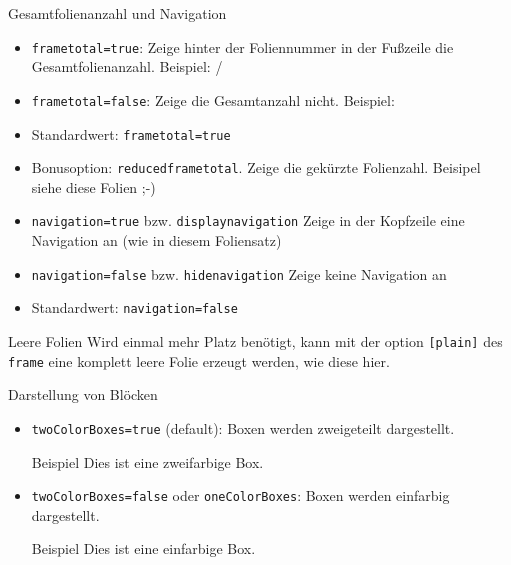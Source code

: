 \documentclass[german,10pt,xcolor=colortbl,compress
]{beamer}
\begin{document}
\begin{frame}{Gesamtfolienanzahl und Navigation}
	\begin{itemize}
		\item \lstinline|frametotal=true|: Zeige hinter der Foliennummer in der Fußzeile die Gesamtfolienanzahl. Beispiel: \insertframenumber{}/\inserttotalframenumber
		\item \lstinline|frametotal=false|: Zeige die Gesamtanzahl nicht. Beispiel: \insertframenumber{}
		\item Standardwert: \lstinline|frametotal=true|
		\item Bonusoption: \lstinline|reducedframetotal|. Zeige die gekürzte Folienzahl. Beisipel siehe diese Folien ;-)
	\end{itemize}
	\vspace{\baselineskip}
	\begin{itemize}
		\item \lstinline|navigation=true| bzw. \lstinline|displaynavigation| Zeige in der Kopfzeile eine Navigation an (wie in diesem Foliensatz)
		\item \lstinline|navigation=false| bzw. \lstinline|hidenavigation| Zeige keine Navigation an
		\item Standardwert: \lstinline|navigation=false|
	\end{itemize}
\end{frame}
\begin{frame}[plain]{Leere Folien}
	Wird einmal mehr Platz benötigt, kann mit der option \lstinline|[plain]| des \lstinline|frame| eine komplett leere Folie erzeugt werden, wie diese hier.
\end{frame}
\begin{frame}{Darstellung von Blöcken}
	\begin{itemize}
		\item \lstinline!twoColorBoxes=true! (default): Boxen werden zweigeteilt dargestellt.
		      \begin{block}{Beispiel}
			      Dies ist eine zweifarbige Box.
		      \end{block}
		\item \lstinline!twoColorBoxes=false! oder \lstinline!oneColorBoxes!: Boxen werden einfarbig dargestellt.
		      \begin{block}{Beispiel}
			      Dies ist eine einfarbige Box.
		      \end{block}
	\end{itemize}\end{frame}
\end{document}
